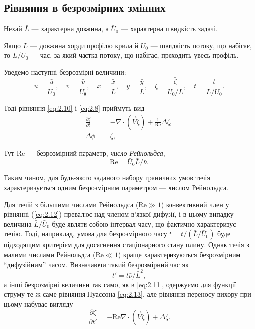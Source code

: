 \subsection{Рівняння в безрозмірних змінних}

Нехай $\bar L$ --- характерна довжина, а $\bar U_0$ --- характерна швидкість задачі.

\begin{example}
    Якщо $\bar L$ --- довжина хорди профілю крила й $\bar U_0$ --- швидкість потоку, що набігає, то $\bar L / \bar U_0$ --- час, за який частка потоку, що набігає, проходить увесь профіль. 
\end{example}

Уведемо наступні безрозмірні величини:
\begin{equation}
    \label{eq:2.11}
    u = \frac{\bar u}{\bar U_0}, \quad v = \frac{\bar v}{\bar U_0}, \quad x = \frac{\bar x}{\bar L}, \quad y = \frac{\bar y}{\bar L}, \quad  \zeta = \frac{\bar \zeta}{\bar U_0 / \bar L}, \quad t = \frac{\bar t}{\bar L / \bar U_0}.
\end{equation}

Тоді рівняння \eqref{eq:2.10} і \eqref{eq:2.8} приймуть вид
\begin{align}
    \label{eq:2.12}
    \frac{\partial \zeta}{\partial t} &= - \nabla \cdot (\vec V \zeta) + \frac{1}{\text{Re}} \Delta \zeta, \\
    \label{eq:2.13}
    \Delta \phi &= \zeta,
\end{align}

\begin{definition}
    Тут $\text{Re}$ --- безрозмірний параметр, \textit{число Рейнольдса},
    \begin{equation}
        \label{eq:2.14}
        \text{Re} = \bar U_0 \bar L / \bar \nu.
    \end{equation}
\end{definition}

Таким чином, для будь-якого заданого набору граничних умов течія характеризується одним безрозмірним параметром --- числом Рейнольдса. \medskip

Для течій з більшими числами Рейнольдса ($\text{Re} \gg 1$) конвективний член у рівнянні (\eqref{eq:2.12}) превалює над членом в'язкої дифузії, і в цьому випадку величина $\bar L/\bar U_0$ буде являти собою інтервал часу, що фактично характеризує течію. Тоді, наприклад, умова для безрозмірного часу $t = \bar t / (\bar L / \bar U_0)$ буде підходящим критерієм для досягнення стаціонарного стану плину. Однак течія з малими числами Рейнольдса ($\text{Re} \ll 1$) краще характеризуються безрозмірним ``дифузійним'' часом. Визначаючи такий безрозмірний час як
\begin{equation}
    t' = \bar t \bar \nu / \bar L^2,
\end{equation}
а інші безрозмірні величини так само, як в \eqref{eq:2.11}, одержуємо для функції струму те ж саме рівняння Пуассона \eqref{eq:2.13}, але рівняння переносу вихору при цьому набуває вигляду
\begin{equation}
    \label{eq:2.16}
    \frac{\partial \zeta}{\partial t'} = - \text{Re} \nabla \cdot (\vec V \zeta) + \Delta \zeta.
\end{equation}


